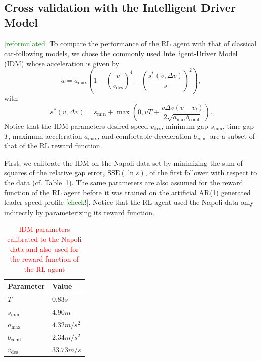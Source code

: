 \documentclass[review]{elsarticle}
\providecommand{\red}[1]{\textcolor{red}{#1}}
\providecommand{\green}[1]{\textcolor{green}{#1}}
\providecommand{\martin}[1]{\red{#1}} %
\providecommand{\martinc}[1]{\green{[#1]}} %
\providecommand{\sub}[1]{_{\mathrm{#1}}}  %
\providecommand{\3}{{\ss}}
\begin{document}
\subsection{Cross validation with the Intelligent Driver Model}
\martinc{reformulated}
To compare the performance of the RL agent with that of
classical car-following models, we chose the commonly used
Intelligent-Driver Model (IDM)\cite{Opus} whose acceleration is given
by
\begin{equation}
\label{eq:IDM}
a=a\sub{max}\left(1-\left(\frac{v}{v\sub{des}}\right)^{4}-\left(\frac{s^{*}\left(v, \Delta v\right)}{s}\right)^{2}\right),
\end{equation}
with
\begin{equation}
\label{eq:IDMsstar}
s^{*}\left(v, \Delta v\right)=s\sub{min}+\max \left(0,vT+\frac{v \Delta v(v-v_l)}{2 \sqrt{a\sub{max} b\sub{comf}}}\right).
\end{equation}
Notice that the IDM parameters desired
speed $v\sub{des}$, minimum gap $s\sub{min}$, time gap $T$, maximum
acceleration $a\sub{max}$, and
comfortable deceleration $b\sub{comf}$ are a subset of that of the RL reward
function. 

First, we calibrate the IDM on the Napoli data set by
minimizing the sum of squares of the relative gap error,
$\mathrm{SSE}(\ln s)$, of the first follower with respect to the
data (cf. Table~\ref{tab:IDMparameters}). The same parameters are also
assumed for the reward function of the RL agent before it was trained
on the artificial AR(1) generated leader speed profile
\martinc{check!}. Notice that the RL agent used the Napoli data only
indirectly by parameterizing its reward function.
\begin{table}
	\caption{\martin{IDM parameters calibrated to the Napoli
            data and also used for the reward function of the RL agent}} 
	\label{tab:IDMparameters} 
	\begin{center}
		\begin{tabular}{ p{} |p{}  } 
		Parameter & Value   \\ \hline
			$T$ & $0.83s$\\
			$s\sub{min}$ & $4.90m$\\
			$a\sub{max}$ & $4.32m/s^2$\\
			$b\sub{comf}$ & $2.34 m/s^2$\\
			$v\sub{des}$ & $33.73m/s$
			
		\end{tabular}
	\end{center}
\end{table}
\end{document}

